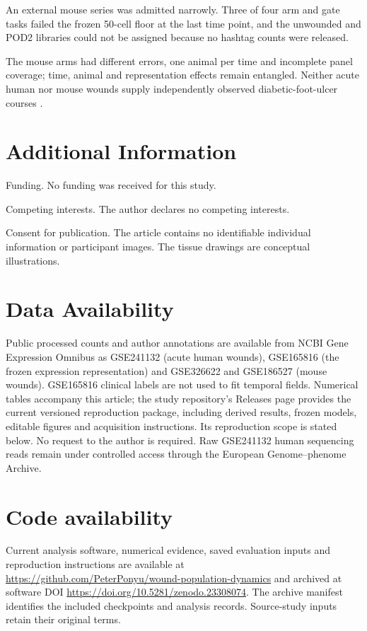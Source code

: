 \documentclass[10pt,a4paper]{article}
\begin{document}
An external mouse series was admitted narrowly. Three of four arm and gate tasks failed the frozen 50-cell floor at the last time point, and the unwounded and POD2 libraries could not be assigned because no hashtag counts were released.

The mouse arms had different errors, one animal per time and incomplete panel coverage; time, animal and representation effects remain entangled. Neither acute human nor mouse wounds supply independently observed diabetic-foot-ulcer courses \citep{armstrong2017}.

\section*{Additional Information}
Funding. No funding was received for this study.

Competing interests. The author declares no competing interests.





Consent for publication. The article contains no identifiable individual information or participant images. The tissue drawings are conceptual illustrations.

\section*{Data Availability}
Public processed counts and author annotations are available from NCBI Gene Expression Omnibus as GSE241132 (acute human wounds), GSE165816 (the frozen expression representation) and GSE326622 and GSE186527 (mouse wounds). GSE165816 clinical labels are not used to fit temporal fields. Numerical tables accompany this article; the study repository's Releases page provides the current versioned reproduction package, including derived results, frozen models, editable figures and acquisition instructions. Its reproduction scope is stated below. No request to the author is required. Raw GSE241132 human sequencing reads remain under controlled access through the European Genome--phenome Archive.

\section*{Code availability}
Current analysis software, numerical evidence, saved evaluation inputs and reproduction instructions are available at \url{https://github.com/PeterPonyu/wound-population-dynamics} and archived at software DOI \url{https://doi.org/10.5281/zenodo.23308074}. The archive manifest identifies the included checkpoints and analysis records. Source-study inputs retain their original terms.
\end{document}
